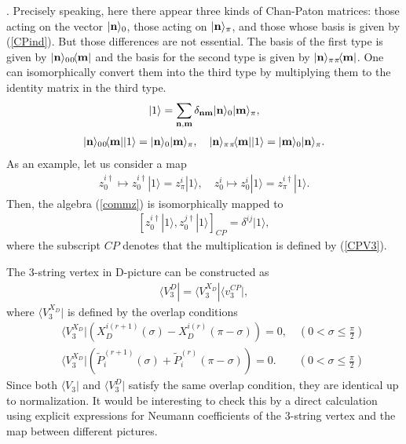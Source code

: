 \documentclass[a4paper,12pt]{article}
\newcommand{\nn}{\nonumber\\}
\def\bra{\langle}
\def\ket{\rangle}
\newcommand{\XD}{X_D}
\begin{document}
\cite{MatSFT}.
%
Precisely  speaking,
here there appear three kinds of Chan-Paton matrices:
those acting on the vector $|{\bf n}\ket_0$,
those acting on $|{\bf n}\ket_\pi$,
and those whose basis is given by
(\ref{CPind}).
But those differences are not essential.
The basis of the first type is given by
$| {\bf n} \ket_0 {}_0\!\bra {\bf m} |$ and
the basis for the second type is given by
$| {\bf n} \ket_\pi {}_\pi\!\bra {\bf m} |$.
One can isomorphically convert them into the
third type by multiplying them to the identity
matrix in the third type.
\begin{eqnarray}
 \label{id}
| {1} \ket 
= 
\sum_{{\bf n},{\bf m}} 
\delta_{{\bf n}{\bf m}}
| {\bf n} \ket_0 | {\bf m} \ket_\pi ,
\end{eqnarray}
\begin{eqnarray}
 \label{isoCP}
| {\bf n} \ket_0 {}_0\!\bra {\bf m} | | {1} \ket 
=| {\bf n} \ket_0 | {\bf m} \ket_\pi,  \quad
| {\bf n} \ket_\pi {}_\pi\!\bra {\bf m} | | {1} \ket 
= | {\bf m} \ket_0 | {\bf n} \ket_\pi .
\end{eqnarray}
As an example, let us consider a map
\begin{eqnarray}
 \label{incl}
z_0^{i \dagger} \mapsto 
 z_{0}^{i \dagger} | {1} \ket =
 z_{\pi}^{i}  | {1} \ket , \quad
z_0^i \mapsto 
 z_{0}^{i} | {1} \ket =
 z_{\pi}^{i \dagger}  | {1} \ket .
\end{eqnarray}
Then, the algebra (\ref{commz}) is
isomorphically mapped to 
\begin{eqnarray}
 \label{SFmat}
 [z_{0}^{i \dagger} | {1} \ket ,
 z_{0}^{j \dagger} | {1} \ket ]_{CP}
= \delta^{ij} | {1} \ket,
\end{eqnarray}
where the subscript $CP$ denotes that the
multiplication is defined by (\ref{CPV3}).



The 3-string vertex in D-picture can be
constructed as
\begin{eqnarray}
 \label{V3D}
\bra V_3^D | =
\bra V_3^{X_D} |
\bra v_3^{CP} | ,
\end{eqnarray}
where $\bra V_3^{X_D} |$ is defined by the overlap
conditions
\begin{eqnarray}
 \label{overlapD}
&&\bra V_3^{X_D} | 
\left(
\XD^{i(r+1)}(\sigma) - \XD^{i(r)}(\pi-\sigma)
\right)
=0, \quad (0 < \sigma \le \frac{\pi}{2}) \nn
&& \bra V_3^{X_D} | 
\left(
\tilde{P}^{(r+1)}_i (\sigma) + \tilde{P}^{(r)}_i(\pi-\sigma)
\right)
=0. \qquad (0 < \sigma \le \frac{\pi}{2}) 
\end{eqnarray}
Since both $\bra V_3|$ and $\bra V_3^D |$
satisfy the same overlap condition,
they are identical
up to normalization.
It would be interesting to
check this
by a direct calculation 
using explicit expressions for Neumann coefficients 
of the 3-string vertex
and the map between different pictures.
\end{document}
